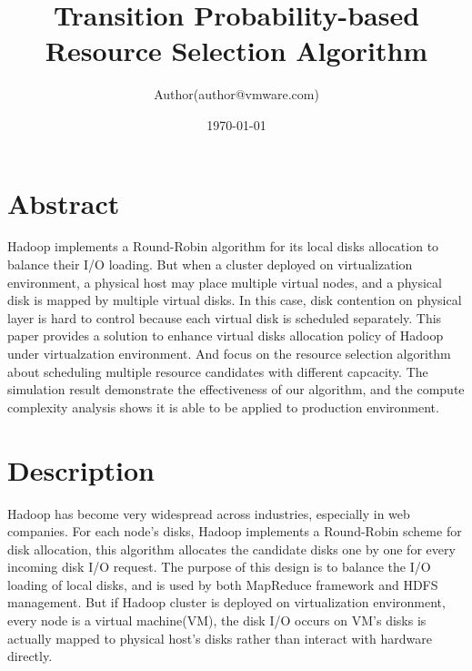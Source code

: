 \documentclass[11pt,a4paper]{article}
\begin{document}
\title{\color{blue}\textbf{Transition Probability-based Resource Selection Algorithm}}
\author{\small Author(author@vmware.com)\\
}
\date{\today}
\maketitle

\section{\textbf\normalsize{Abstract}}

Hadoop implements a Round-Robin algorithm for
its local disks allocation to balance their I/O loading.
But when a cluster deployed on virtualization environment, a physical host may place multiple
virtual nodes, and a physical disk is mapped by multiple virtual 
disks. In this case, disk contention on physical layer is hard to control because each 
virtual disk is scheduled separately.
This paper provides a solution to enhance virtual disks allocation policy of Hadoop under
virtualzation environment. And focus on the resource selection 
algorithm about scheduling multiple resource candidates with different capcacity.
The simulation result demonstrate the effectiveness of our algorithm, and the compute complexity
analysis shows it is able to be applied to production environment.

\section{\textbf\normalsize{Description}}

Hadoop has become very widespread across industries, 
especially in web companies. For each node's disks,
Hadoop implements a Round-Robin scheme for disk allocation,
this algorithm allocates the candidate disks one by 
one for every incoming disk I/O request. The purpose of this design is to balance 
the I/O loading of local disks, and is used by both MapReduce framework and HDFS 
management. But if Hadoop cluster is deployed on virtualization environment, every node is 
a virtual machine(VM), the disk I/O occurs on VM's disks is actually 
mapped to physical host's disks rather than interact with hardware directly.
\end{document}
